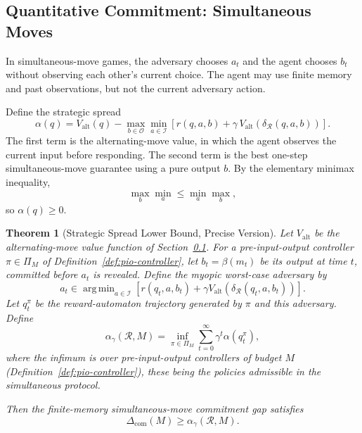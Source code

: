 \documentclass[12pt]{article}
\newtheorem{theorem}{Theorem}[section]
\theoremstyle{definition}
\DeclareMathOperator*{\argmin}{arg\,min}
\newcommand{\Com}{\Delta_{\mathrm{com}}}
\newcommand{\Valt}{V_{\mathrm{alt}}}
\begin{document}
\subsection{Quantitative Commitment: Simultaneous Moves}
\label{subsec:quant-simul}

In simultaneous-move games, the adversary chooses $a_t$ and the agent chooses
$b_t$ without observing each other's current choice.  The agent may use finite
memory and past observations, but not the current adversary action.

Define the strategic spread
\[
\alpha(q)
=
\Valt(q)
-
\max_{b\in\mathcal O}
\min_{a\in\mathcal I}
\left[
r(q,a,b)+\gamma\,\Valt(\delta_{\mathcal R}(q,a,b))
\right].
\]
The first term is the alternating-move value, in which the agent observes the
current input before responding.  The second term is the best one-step
simultaneous-move guarantee using a pure output $b$.  By the elementary minimax
inequality,
\[
\max_b\min_a \le \min_a\max_b,
\]
so $\alpha(q)\ge0$.

\begin{theorem}[Strategic Spread Lower Bound, Precise Version]
\label{thm:strategic-spread}
Let $\Valt$ be the alternating-move value function of
Section~\ref{subsec:quant-simul}.
For a pre-input-output controller $\pi\in\Pi_M$ of
Definition~\ref{def:pio-controller}, let $b_t=\beta(m_t)$ be its output at
time $t$, committed before $a_t$ is revealed.  Define the myopic worst-case adversary by
\[
a_t
\in
\argmin_{a\in\mathcal I}
\left[
r(q_t,a,b_t)+\gamma \Valt(\delta_{\mathcal R}(q_t,a,b_t))
\right].
\]
Let $q_t^\pi$ be the reward-automaton trajectory generated by $\pi$ and this
adversary.  Define
\[
\alpha_\gamma(\mathcal R,M)
=
\inf_{\pi\in\Pi_M}
\sum_{t=0}^{\infty}
\gamma^t
\alpha(q_t^\pi),
\]
where the infimum is over pre-input-output controllers of budget $M$
(Definition~\ref{def:pio-controller}), these being the policies admissible in
the simultaneous protocol.

Then the finite-memory simultaneous-move commitment gap satisfies
\[
\Com(M)
\ge
\alpha_\gamma(\mathcal R,M).
\]
\end{theorem}
\end{document}
